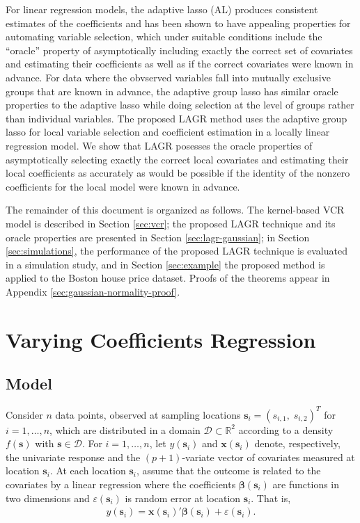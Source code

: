 \documentclass[english]{article}\usepackage[]{graphicx}\usepackage[]{color}
\theoremstyle{plain}
\theoremstyle{plain}
\begin{document}
For linear regression models, the adaptive lasso (AL) \citep{Zou-2006}
produces consistent estimates of the coefficients and has been shown
to have appealing properties for automating variable selection, which
under suitable conditions include the ``oracle'' property of asymptotically
including exactly the correct set of covariates and estimating their
coefficients as well as if the correct covariates were known in advance.
For data where the obvserved variables fall into mutually exclusive
groups that are known in advance, the adaptive group lasso \citep{Yuan-Lin-2006,Wang-Leng-2008}
has similar oracle properties to the adaptive lasso while doing selection
at the level of groups rather than individual variables. The proposed
LAGR method uses the adaptive group lasso for local variable selection
and coefficient estimation in a locally linear regression model. We
show that LAGR posesses the oracle properties of asymptotically selecting
exactly the correct local covariates and estimating their local coefficients
as accurately as would be possible if the identity of the nonzero
coefficients for the local model were known in advance.

The remainder of this document is organized as follows. The kernel-based
VCR model is described in Section \ref{sec:vcr}; the proposed LAGR
technique and its oracle properties are presented in Section \ref{sec:lagr-gaussian};
in Section \ref{sec:simulations}, the performance of the proposed
LAGR technique is evaluated in a simulation study, and in Section
\ref{sec:example} the proposed method is applied to the Boston house
price dataset. Proofs of the theorems appear in Appendix \ref{sec:gaussian-normality-proof}.


\section{Varying Coefficients Regression\label{sec:vcr}}


\subsection{Model}

Consider $n$ data points, observed at sampling locations $\bm{s}_{i}=(s_{i,1},\; s_{i,2})^{T}$
for $i=1,\dots,n$, which are distributed in a domain $\mathcal{D}\subset\mathbb{R}^{2}$
according to a density $f(\bm{s})$ with $\bm{s}\in\mathcal{D}$.
For $i=1,\dots,n$, let $y(\bm{s}_{i})$ and $\bm{x}(\bm{s}_{i})$
denote, respectively, the univariate response and the $(p+1)$-variate
vector of covariates measured at location $\bm{s}_{i}$. At each location
$\bm{s}_{i}$, assume that the outcome is related to the covariates
by a linear regression where the coefficients $\bm{\beta}(\bm{s}_{i})$
are functions in two dimensions and $\varepsilon(\bm{s}_{i})$ is
random error at location $\bm{s}_{i}$. That is, 
\begin{align}
y(\bm{s}_{i})=\bm{x}(\bm{s}_{i})'\bm{\beta}(\bm{s}_{i})+\varepsilon(\bm{s}_{i}).\label{eq:lm(s)}
\end{align}
\end{document}
